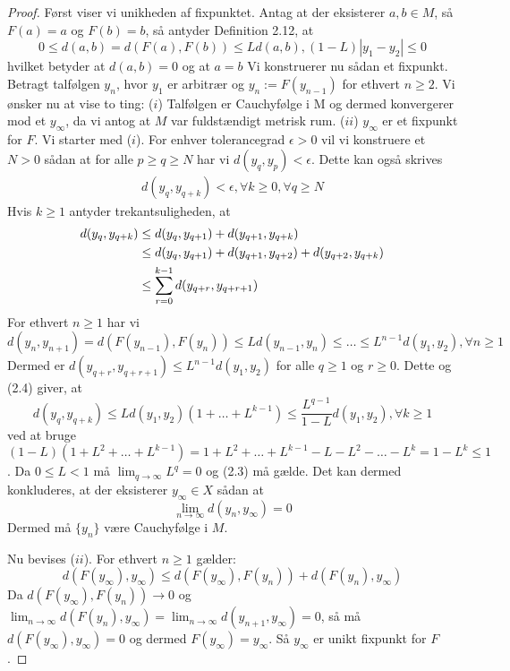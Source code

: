\begin{proof}
Først viser vi unikheden af fixpunktet. Antag at der eksisterer $a,b \in M$, så $F(a)=a$ og $F(b)=b$, så antyder Definition 2.12, at \hfill \break
$$0\leq d(a,b)=d(F(a),F(b))\leq Ld(a,b), (1-L)|y_1-y_2|\leq 0$$
hvilket betyder at $d(a,b)=0$ og at $a=b$ \hfill \break
\hfill \break
Vi konstruerer nu sådan et fixpunkt. Betragt talfølgen ${y_n}$, hvor $y_1$ er arbitrær og $y_n:=F(y_{n-1})$ for ethvert $n\geq 2$. Vi ønsker nu at vise to ting:\hfill \break
 ($i$) Talfølgen er Cauchyfølge i M og dermed konvergerer mod et $y_\infty$, da vi antog at $M$ var fuldstændigt metrisk rum.\hfill  \break
($ii$) $y_\infty$ er et fixpunkt for $F$. \hfill \break
Vi starter med ($i$). For enhver tolerancegrad $\epsilon > 0$ vil vi konstruere et $N > 0$ sådan at for alle $p\geq q \geq N$ har vi $d(y_q,y_p)<\epsilon$. Dette kan også skrives \hfill \break
\begin{align}
d(y_q,y_{q+k})<\epsilon,  \forall k \geq 0, \forall q \geq N
\end{align}
Hvis $k \geq 1$ antyder trekantsuligheden, at \hfill \break
\begin{align}
d(y_q,y_{q+k}) &\leq d(y_{q},y_{q+1})+d(y_{q+1},y_{q+k}) \notag\\
&\leq d(y_q,y_{q+1})+d(y_{q+1},y_{q+2})+d(y_{q+2},y_{q+k}) \notag\\
&\leq \sum\limits_{r=0}^{k-1} d(y_{q+r},y_{q+r+1})
\end{align}
For ethvert $n\geq 1$ har vi \hfill \break
$$d(y_n,y_{n+1})=d(F(y_{n-1}),F(y_n)) \leq Ld(y_{n-1},y_n) \leq \hdots \leq L^{n-1}d(y_1,y_2), \forall n \geq 1$$
Dermed er $d(y_{q+r},y_{q+r+1}) \leq L^{n-1}d(y_1,y_2)$ for alle $q \geq 1$ og $r\geq 0$. Dette og (2.4) giver, at \hfill \break
$$d(y_q,y_{q+k}) \leq L d(y_1,y_2)(1+\hdots+L^{k-1}) \leq \frac{L^{q-1}}{1-L}d(y_1,y_2), \forall k \geq 1$$
ved at bruge $(1-L)(1+L^2+\hdots+L^{k-1})=1+L^2+\hdots +L^{k-1}-L-L^2-\hdots -L^k= 1-L^k \leq 1$. \hfill \break
Da $0 \leq L < 1$ må $\lim_{q\rightarrow\infty} L^q=0$ og (2.3) må gælde. Det kan dermed konkluderes, at der eksisterer $y_\infty \in X$ sådan at \hfill \break
$$\lim_{n \to \infty} d(y_n,y_\infty)=0$$
Dermed må $\{y_n\}$ være Cauchyfølge i $M$. \hfill \break

Nu bevises ($ii$). For ethvert $n \geq 1$ gælder:
$$d(F(y_\infty),y_\infty)\leq d(F(y_\infty),F(y_n))+d(F(y_n),y_\infty)$$
Da $d(F(y_\infty),F(y_n))\rightarrow 0$ og $\lim_{n \to \infty} d(F(y_n),y_\infty) = \lim_{n \to \infty} d(y_{n+1},y_\infty)=0$, så må $d(F(y_\infty),y_\infty)=0$ og dermed $F(y_\infty)=y_\infty$. Så $y_\infty$ er unikt fixpunkt for $F$.
\end{proof}

